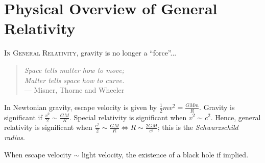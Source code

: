 { %
\renewcommand{\thechapter}{\arabic{chapter}} %
\chapter{Physical Overview of General Relativity}
}

\textsc{In General Relativity}, gravity is no longer a ``force''...

\begin{quote}
    \emph{Space tells matter how to move; \\
   \hspace*{1em} Matter tells space how to curve.} \\
   \hspace*{2em} --- Misner, Thorne and Wheeler
\end{quote}

\begin{center}
\end{center}

\noindent
In Newtonian gravity, escape velocity is given by $\frac12mv^2 = \frac{GMm}{R}$.
Gravity is significant if $\frac{v^2}{2} \sim \frac{GM}{R}$.
Special relativity is significant when $v^2 \sim c^2$.
Hence, general relativity is significant when $\frac{c^2}{2} \sim \frac{GM}{R} \iff R \sim \frac{2GM}{c^2}$; this is the \emph{Schwarzschild radius}.

When escape velocity $\sim$ light velocity, the existence of a {black hole} if implied.